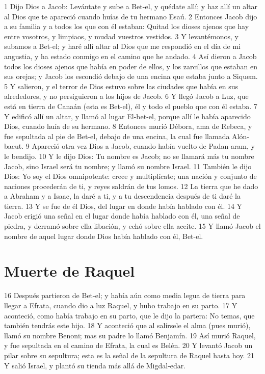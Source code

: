 1 Dijo Dios a Jacob: Levántate y sube a Bet-el, y quédate allí; y haz allí un altar al Dios que te apareció cuando huías de tu hermano Esaú.
2 Entonces Jacob dijo a su familia y a todos los que con él estaban: Quitad los dioses ajenos que hay entre vosotros, y limpiaos, y mudad vuestros vestidos.
3 Y levantémonos, y subamos a Bet-el; y haré allí altar al Dios que me respondió en el día de mi angustia, y ha estado conmigo en el camino que he andado.
4 Así dieron a Jacob todos los dioses ajenos que había en poder de ellos, y los zarcillos que estaban en sus orejas; y Jacob los escondió debajo de una encina que estaba junto a Siquem.
5 Y salieron, y el terror de Dios estuvo sobre las ciudades que había en sus alrededores, y no persiguieron a los hijos de Jacob.
6 Y llegó Jacob a Luz, que está en tierra de Canaán (esta es Bet-el), él y todo el pueblo que con él estaba.
7 Y edificó allí un altar, y llamó al lugar El-bet-el, porque allí le había aparecido Dios, cuando huía de su hermano.
8 Entonces murió Débora, ama de Rebeca, y fue sepultada al pie de Bet-el, debajo de una encina, la cual fue llamada Alón-bacut.
9 Apareció otra vez Dios a Jacob, cuando había vuelto de Padan-aram, y le bendijo.
10 Y le dijo Dios: Tu nombre es Jacob; no se llamará más tu nombre Jacob, sino Israel será tu nombre; y llamó su nombre Israel.
11 También le dijo Dios: Yo soy el Dios omnipotente: crece y multiplícate; una nación y conjunto de naciones procederán de ti, y reyes saldrán de tus lomos.
12 La tierra que he dado a Abraham y a Isaac, la daré a ti, y a tu descendencia después de ti daré la tierra.
13 Y se fue de él Dios, del lugar en donde había hablado con él.
14 Y Jacob erigió una señal en el lugar donde había hablado con él, una señal de piedra, y derramó sobre ella libación, y echó sobre ella aceite.
15 Y llamó Jacob el nombre de aquel lugar donde Dios había hablado con él, Bet-el.

\section*{Muerte de Raquel}

16 Después partieron de Bet-el; y había aún como media legua de tierra para llegar a Efrata, cuando dio a luz Raquel, y hubo trabajo en su parto.
17 Y aconteció, como había trabajo en su parto, que le dijo la partera: No temas, que también tendrás este hijo.
18 Y aconteció que al salírsele el alma (pues murió), llamó su nombre Benoni; mas su padre lo llamó Benjamín.
19 Así murió Raquel, y fue sepultada en el camino de Efrata, la cual es Belén.
20 Y levantó Jacob un pilar sobre su sepultura; esta es la señal de la sepultura de Raquel hasta hoy.
21 Y salió Israel, y plantó su tienda más allá de Migdal-edar.


